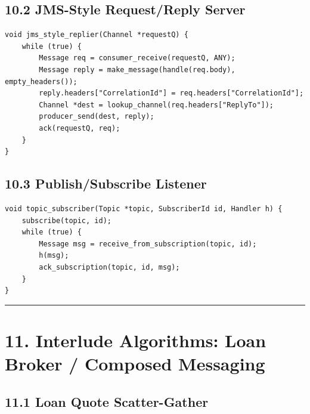 \documentclass[11pt]{article}
\begin{document}
\subsection{10.2 JMS-Style Request/Reply
Server}\label{jms-style-requestreply-server}

\begin{verbatim}
void jms_style_replier(Channel *requestQ) {
    while (true) {
        Message req = consumer_receive(requestQ, ANY);
        Message reply = make_message(handle(req.body), empty_headers());
        reply.headers["CorrelationId"] = req.headers["CorrelationId"];
        Channel *dest = lookup_channel(req.headers["ReplyTo"]);
        producer_send(dest, reply);
        ack(requestQ, req);
    }
}
\end{verbatim}

\subsection{10.3 Publish/Subscribe
Listener}\label{publishsubscribe-listener}

\begin{verbatim}
void topic_subscriber(Topic *topic, SubscriberId id, Handler h) {
    subscribe(topic, id);
    while (true) {
        Message msg = receive_from_subscription(topic, id);
        h(msg);
        ack_subscription(topic, id, msg);
    }
}
\end{verbatim}

\begin{center}\rule{0.5\linewidth}{0.5pt}\end{center}

\section{11. Interlude Algorithms: Loan Broker / Composed
Messaging}\label{interlude-algorithms-loan-broker-composed-messaging}

\subsection{11.1 Loan Quote
Scatter-Gather}\label{loan-quote-scatter-gather}
\end{document}
